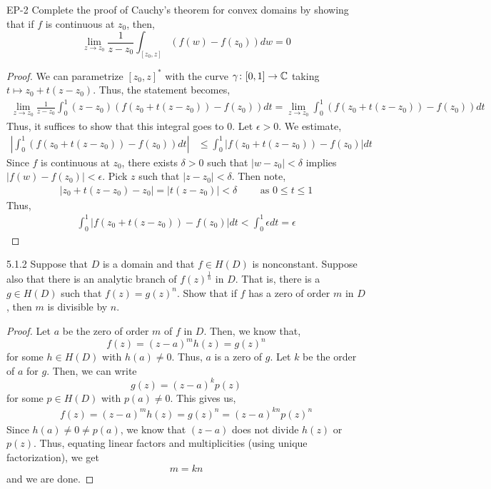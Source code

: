 \documentclass[12pt]{amsart}
\begin{document}
\begin{problem}{EP-2}
    Complete the proof of Cauchy's theorem for convex domains by showing that if $f$ is continuous at $z_0$, then, 
    \[ \lim_{z \to z_0} \frac{1}{z-z_0} \int_{[z_0, z]} (f(w)-f(z_0))dw = 0 \]
\end{problem}
\begin{proof}
    We can parametrize $[z_0, z]^*$ with the curve $\gamma\colon [0, 1] \to \mathbb C$ taking $t \mapsto z_0+t(z-z_0)$. Thus, the statement becomes,
    \begin{align*}
        \lim_{z \to z_0} \frac{1}{z-z_0} \int_{0}^1 (z-z_0)(f\left(z_0+t(z-z_0)\right)-f(z_0))dt = \lim_{z \to z_0} \int_{0}^1 (f\left(z_0+t(z-z_0)\right)-f(z_0))dt
    \end{align*}
    Thus, it suffices to show that this integral goes to $0$. Let $\epsilon > 0$. We estimate, 
    \begin{align*}
        \left|\int_{0}^1 (f\left(z_0+t(z-z_0)\right)-f(z_0))dt\right| & \leq \int_0^1 \left|f(z_0+t(z-z_0))-f(z_0) \right|dt
    \end{align*}
    Since $f$ is continuous at $z_0$, there exists $\delta > 0$ such that $|w-z_0| < \delta$ implies $|f(w)-f(z_0)| < \epsilon$. Pick $z$ such that $|z-z_0| < \delta$. Then note, 
    \begin{align*}
        |z_0 +t(z-z_0) -z_0| = |t(z-z_0)| < \delta \qquad  \text{ as } 0 \leq t \leq 1
    \end{align*}
    Thus, 
    \begin{align*}
        \int_0^1 \left|f(z_0+t(z-z_0))-f(z_0) \right|dt < \int_0^1 \epsilon dt = \epsilon
    \end{align*}
\end{proof}
\newpage 

\begin{problem}{5.1.2}
    Suppose that $D$ is a domain and that $f \in H(D)$ is nonconstant. Suppose also that there is an analytic branch of $f(z)^{\frac{1}{n}}$ in $D$. That is, there is a $g \in H(D)$ such that $f(z) = g(z)^n$. Show that if $f$ has a zero of order $m$ in $D$, then $m$ is divisible by $n$. 
\end{problem}
\begin{proof}
    Let $a$ be the zero of order $m$ of $f$ in $D$. Then, we know that, 
    \[ f(z) = (z-a)^mh(z) = g(z)^n\]
    for some $h \in H(D)$ with $h(a) \neq 0$. Thus, $a$ is a zero of $g$. Let $k$ be the order of $a$ for $g$. Then, we can write 
    \[ g(z) = (z-a)^kp(z)\]
    for some $p \in H(D)$ with $p(a) \neq 0$. This gives us, 
    \begin{align*}
        f(z) = (z-a)^mh(z) = g(z)^n = (z-a)^{kn}p(z)^n 
    \end{align*} 
    Since $h(a) \neq 0 \neq p(a)$, we know that $(z-a)$ does not divide $h(z)$ or $p(z)$. Thus, equating linear factors and multiplicities (using unique factorization), we get 
    \[ m = kn \]
    and we are done.
\end{proof}
\newpage
\end{document}
